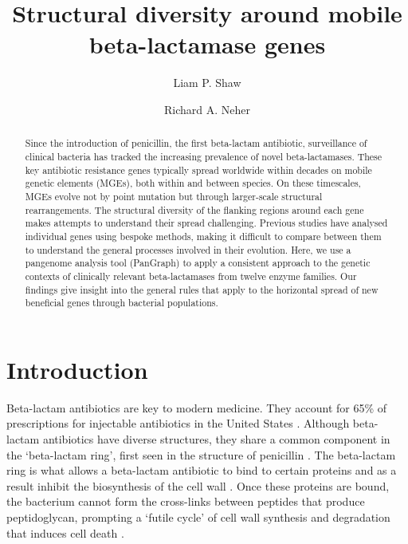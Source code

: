 \documentclass[aps,rmp,preprint,superscriptaddress,10pt,twocolumn]{revtex4-1}
\begin{document}
\title{Structural diversity around mobile beta-lactamase genes}
\author{Liam P. Shaw}
\author{Richard A. Neher}

\begin{abstract}
Since the introduction of penicillin, the first beta-lactam antibiotic, surveillance of clinical bacteria has tracked the increasing prevalence of novel beta-lactamases. These key antibiotic resistance genes typically spread worldwide within decades on mobile genetic elements (MGEs), both within and between species. On these timescales, MGEs evolve not by point mutation but through larger-scale structural rearrangements. The structural diversity of the flanking regions around each gene makes attempts to understand their spread challenging. Previous studies have analysed individual genes using bespoke methods, making it difficult to compare between them to understand the general processes involved in their evolution. Here, we use a pangenome analysis tool (PanGraph) to apply a consistent approach to the genetic contexts of clinically relevant beta-lactamases from twelve enzyme families. Our findings give insight into the general rules that apply to the horizontal spread of new beneficial genes through bacterial populations.    
\end{abstract}


\maketitle

\section{Introduction}

\noindent Beta-lactam antibiotics are key to modern medicine. They account for 65\% of prescriptions for injectable antibiotics in the United States \cite{Bush2016}. Although beta-lactam antibiotics have diverse structures, they share a common component in the `beta-lactam ring', first seen in the structure of penicillin \cite{Chain1946}. The beta-lactam ring is what allows a beta-lactam antibiotic to bind to certain proteins and as a result inhibit the biosynthesis of the cell wall \cite{Park1957}. Once these proteins are bound, the bacterium cannot form the cross-links between peptides that produce peptidoglycan, prompting a `futile cycle' of cell wall synthesis and degradation that induces cell death \cite{Cho2014}.\par
\end{document}
